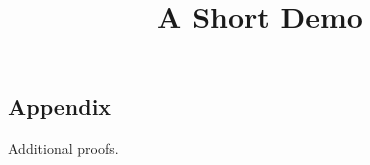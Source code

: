 \documentclass[article]{jss}
\title{A Short Demo}
\begin{document}
\begin{appendix}
\section*{Appendix}
Additional proofs.
\end{appendix}
\end{document}

